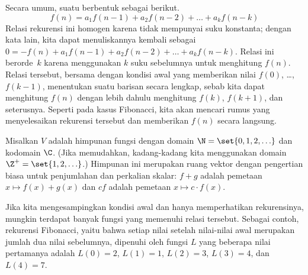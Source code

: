 Secara umum, suatu
berbentuk sebagai berikut.
\begin{equation*}
  f(n)=a_1f(n-1)+a_2f(n-2)+\dots+a_kf(n-k)
\end{equation*}
Relasi rekurensi ini homogen karena tidak mempunyai suku konstanta; dengan
kata lain, kita dapat menuliskannya kembali sebagai
$0=-f(n)+a_1f(n-1)+a_2f(n-2)+\dots+a_kf(n-k)$.
Relasi ini berorde~$k$ karena menggunakan $k$ suku sebelumnya untuk
menghitung $f(n)$.
Relasi tersebut, bersama dengan
kondisi awal yang memberikan nilai
$f(0)$, \ldots, $f(k-1)$, menentukan suatu barisan secara lengkap, sebab
kita dapat menghitung $f(n)$ dengan lebih dahulu menghitung $f(k)$,
$f(k+1)$, dan seterusnya.
Seperti pada kasus Fibonacci, kita akan mencari rumus yang menyelesaikan
rekurensi tersebut dan memberikan $f(n)$ secara langsung.

Misalkan $V$ adalah himpunan fungsi dengan domain
$\N=\set{0,1,2,\ldots}$ dan kodomain $\C$.
(Jika memudahkan, kadang-kadang kita menggunakan domain
$\Z^+=\set{1,2,\ldots}$.)
Himpunan ini merupakan ruang vektor dengan pengertian biasa untuk
penjumlahan dan perkalian skalar: $f+g$ adalah pemetaan
$x\mapsto f(x)+g(x)$ dan $cf$ adalah pemetaan $x\mapsto c\cdot f(x)$.

Jika kita mengesampingkan kondisi awal dan hanya memperhatikan
rekurensinya, mungkin terdapat banyak fungsi yang memenuhi relasi tersebut.
Sebagai contoh, rekurensi Fibonacci, yaitu bahwa setiap nilai setelah
nilai-nilai awal merupakan jumlah dua nilai sebelumnya, dipenuhi oleh fungsi
$L$ yang beberapa nilai pertamanya adalah $L(0)=2$, $L(1)=1$, $L(2)=3$,
$L(3)=4$, dan $L(4)=7$.


